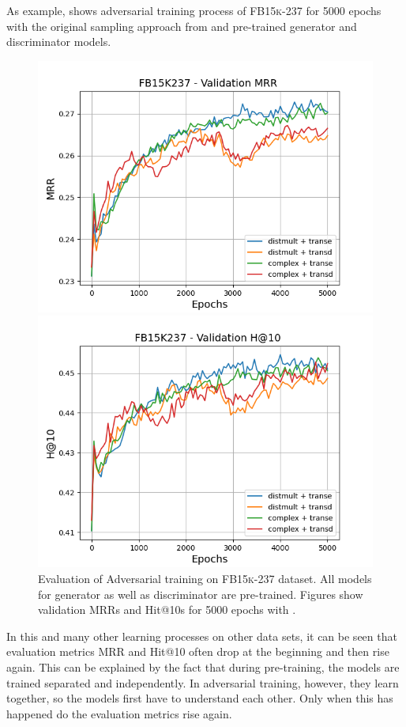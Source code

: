 As example,  shows adversarial training process of \textsc{FB15k-237} for 5000 epochs with the original sampling approach from \kbgan and pre-trained  generator and discriminator models.
\begin{figure}
    \centering
    \begin{minipage}{.5\textwidth}
      \centering
      \includegraphics[width=0.9\linewidth]{figures/results/gan_train/pretrained/random/fb15k237/gan_train_random_fb15k237_mrrs.png}
    \end{minipage}%
    \begin{minipage}{.5\textwidth}
      \centering
      \includegraphics[width=0.9\linewidth]{figures/results/gan_train/pretrained/random/fb15k237/gan_train_random_fb15k237_hit10s.png}
    \end{minipage}
    \caption{Evaluation of Adversarial training on \textsc{FB15k-237} dataset.
    All models for generator as well as discriminator are pre-trained.
    Figures show validation MRRs and Hit@10s for 5000 epochs with \origsampling.}
    \label{fig:original_pretrained_advtrain}
\end{figure}
In this and many other learning processes on other data sets, it can be seen that evaluation metrics MRR and Hit@10 often drop at the beginning and then rise again.
This can be explained by the fact that during pre-training, the models are trained separated and independently.
In adversarial training, however, they learn together, so the models first have to understand each other.
Only when this has happened do the evaluation metrics rise again.

